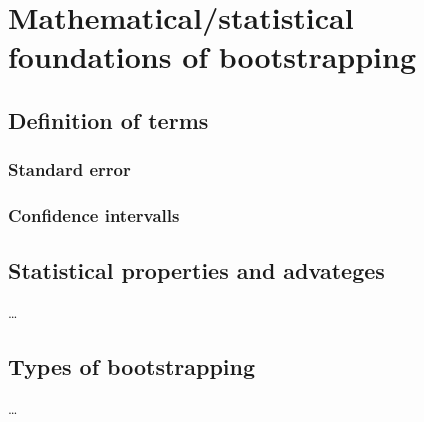 

\chapter{Mathematical/statistical foundations of bootstrapping} \label{Foundations}


\section{Definition of terms}

\subsection{Standard error}

\subsection{Confidence intervalls}


\section{Statistical properties and advateges}
\ldots
\section{Types of bootstrapping}
\ldots
